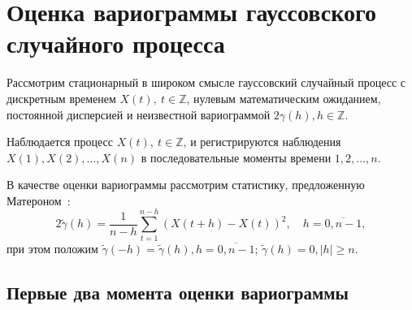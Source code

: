 
\newpage

\chapter{Оценка вариограммы гауссовского случайного процесса}
\label{c:variogram_estimation}

Рассмотрим стационарный в широком смысле гауссовский случайный процесс с дискретным временем $ X(t),~ t \in \mathbb{Z} $, нулевым математическим ожиданием, постоянной дисперсией и неизвестной вариограммой $ 2 \gamma(h), h \in \mathbb{Z} $.

Наблюдается процесс $ X(t),~ t \in \mathbb{Z} $, и регистрируются наблюдения $ X(1), X(2), \dots, X(n) $ в последовательные моменты времени $ 1, 2, \dots, n $.

В качестве оценки вариограммы рассмотрим статистику, предложенную Матероном~\cite{matheron1980}:
\begin{equation}
\label{eq:var_estimation}
	2 \tilde{\gamma}(h) = \frac{1}{n - h} \sum_{t = 1}^{n - h}{(X(t + h) - X(t))}^2, \quad h = \overline{0, n - 1},
\end{equation}
при этом положим $ \tilde{\gamma}(-h) = \tilde{\gamma}(h), h = \overline{0, n - 1}$; $ \tilde{\gamma}(h) = 0, \vert h \vert \ge n $.

\section{Первые два момента оценки вариограммы} %
\label{sec:variogram_moments}

